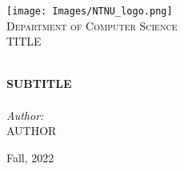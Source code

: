 
\begin{titlepage}
\vbox{ }
\vbox{ }
\begin{center}
\texttt{[image: Images/NTNU\_logo.png]}\\[1cm]
\textsc{\LARGE Department of Computer Science}\\[1.5cm]
\textsc{\Large TITLE}\\[0.5cm]
\vbox{ }

\HRule \\[0.4cm]
{ \huge \bfseries SUBTITLE}\\[0.4cm]
\HRule \\[1.5cm]

\large
\emph{Author:}\\
AUTHOR
\vfill

{\large Fall, 2022}
\end{center}
\end{titlepage}